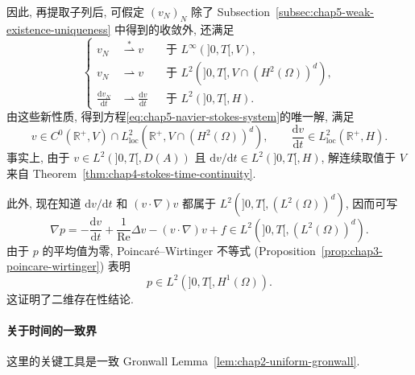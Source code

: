 因此, 再提取子列后, 可假定 $(v_N)_N$ 除了 Subsection~\ref{subsec:chap5-weak-existence-uniqueness} 中得到的收敛外, 还满足
\[
 \left\{
 \begin{aligned}
 v_N&\stackrel{*}{\rightharpoonup}v&&\text{于 }L^\infty(]0,T[,V),\\
 v_N&\rightharpoonup v&&\text{于 }L^2(]0,T[,V\cap(H^2(\Omega))^d),\\
 \frac{\mathrm dv_N}{\mathrm dt}&\rightharpoonup\frac{\mathrm dv}{\mathrm dt}&&\text{于 }L^2(]0,T[,H).
 \end{aligned}
 \right.
\]
由这些新性质, 得到方程\eqref{eq:chap5-navier-stokes-system}的唯一解, 满足
\[
 v\in C^0(\mathbb R^+,V)\cap L_{\mathrm{loc}}^2(\mathbb R^+,V\cap(H^2(\Omega))^d),
 \qquad
 \frac{\mathrm dv}{\mathrm dt}\in L_{\mathrm{loc}}^2(\mathbb R^+,H).
\]
事实上, 由于 $v\in L^2(]0,T[,D(A))$ 且 $\mathrm dv/\mathrm dt\in L^2(]0,T[,H)$, 解连续取值于 $V$ 来自 Theorem~\ref{thm:chap4-stokes-time-continuity}.

此外, 现在知道 $\mathrm dv/\mathrm dt$ 和 $(v\cdot\nabla)v$ 都属于 $L^2(]0,T[,(L^2(\Omega))^d)$, 因而可写
\[
 \nabla p=-\frac{\mathrm dv}{\mathrm dt}+\frac1{\operatorname{Re}}\Delta v-(v\cdot\nabla)v+f
 \in L^2(]0,T[,(L^2(\Omega))^d).
\]
由于 $p$ 的平均值为零, Poincaré--Wirtinger 不等式 (Proposition~\ref{prop:chap3-poincare-wirtinger}) 表明
\[
 p\in L^2(]0,T[,H^1(\Omega)).
\]
这证明了二维存在性结论.

\paragraph{关于时间的一致界}
\label{subsec:chap5-strong-uniform-time-bound}

这里的关键工具是一致 Gronwall Lemma~\ref{lem:chap2-uniform-gronwall}.

